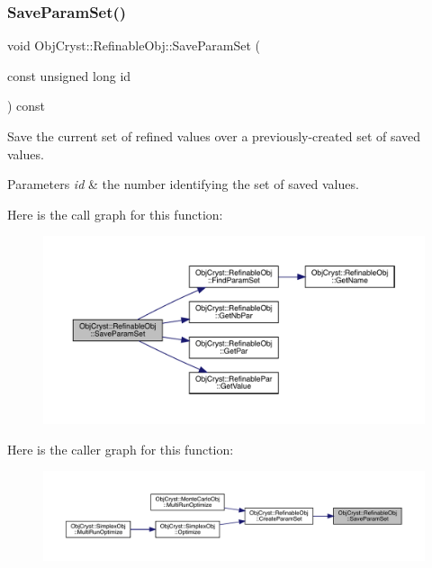 \mbox{\label{class_obj_cryst_1_1_refinable_obj_a515a81780181269eb232278f7511b2bb}} 
\subsubsection{\texorpdfstring{SaveParamSet()}{SaveParamSet()}}
{\footnotesize\ttfamily void Obj\+Cryst\+::\+Refinable\+Obj\+::\+Save\+Param\+Set (\begin{DoxyParamCaption}\item[{const unsigned long}]{id }\end{DoxyParamCaption}) const}



Save the current set of refined values over a previously-\/created set of saved values. 


\begin{DoxyParams}{Parameters}
{\em id} & the number identifying the set of saved values. \\
\hline
\end{DoxyParams}
Here is the call graph for this function\+:
\nopagebreak
\begin{figure}[H]
\begin{center}
\leavevmode
\includegraphics[width=350pt]{class_obj_cryst_1_1_refinable_obj_a515a81780181269eb232278f7511b2bb_cgraph}
\end{center}
\end{figure}
Here is the caller graph for this function\+:
\nopagebreak
\begin{figure}[H]
\begin{center}
\leavevmode
\includegraphics[width=350pt]{class_obj_cryst_1_1_refinable_obj_a515a81780181269eb232278f7511b2bb_icgraph}
\end{center}
\end{figure}
\mbox{\label{class_obj_cryst_1_1_refinable_obj_a4cec55794b964b148ef44bf244ad4104}} 
